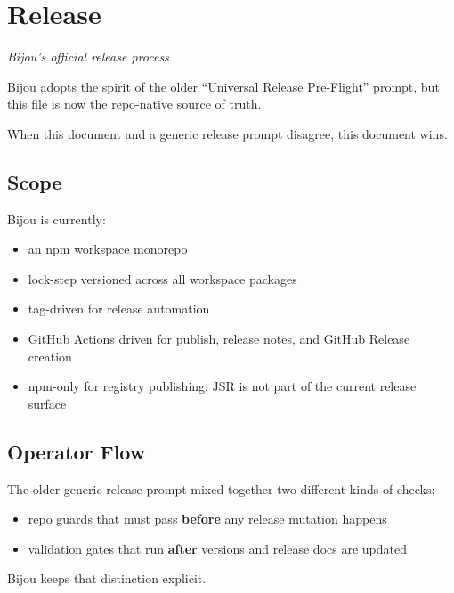 \chapter{Release}\label{record-274}

\smallskip

\emph{Bijou's official release process}

Bijou adopts the spirit of the older ``Universal Release Pre-Flight'' prompt, but this file is now the repo-native source of truth.

When this document and a generic release prompt disagree, this document wins.

\section{Scope}\label{record-274-scope}

Bijou is currently:

\begin{itemize}
\tightlist
\item
  an npm workspace monorepo
\item
  lock-step versioned across all workspace packages
\item
  tag-driven for release automation
\item
  GitHub Actions driven for publish, release notes, and GitHub Release creation
\item
  npm-only for registry publishing; JSR is not part of the current release surface
\end{itemize}

\section{Operator Flow}\label{record-274-operator-flow}

The older generic release prompt mixed together two different kinds of checks:

\begin{itemize}
\tightlist
\item
  repo guards that must pass \textbf{before} any release mutation happens
\item
  validation gates that run \textbf{after} versions and release docs are updated
\end{itemize}

Bijou keeps that distinction explicit.

